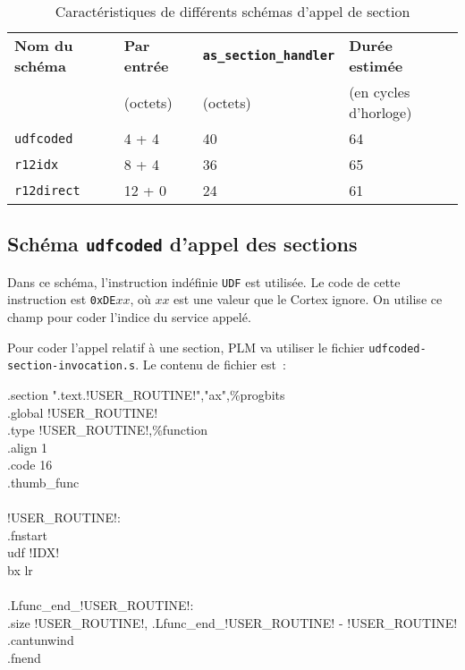 \begin{table}[t]
\centering
\begin{tabular}{llll}
  \textbf{Nom du schéma} & \textbf{Par entrée} & \textbf{\texttt{as\_section\_handler}} & \textbf{Durée estimée} \\
   & (octets) & (octets) & (en cycles d'horloge) \\
  \texttt{udfcoded} & 4 + 4 & 40 & 64 \\
  \texttt{r12idx} & 8 + 4 & 36 & 65 \\
  \texttt{r12direct} & 12 + 0 & 24 & 61 \\
\end{tabular}
\caption{Caractéristiques de différents schémas d'appel de section}
\ligne
\end{table}


\subsection{Schéma \texttt{udfcoded} d'appel des sections}

Dans ce schéma, l'instruction indéfinie \texttt{UDF} est utilisée. Le code de cette instruction est \texttt{0xDE$xx$}, où $xx$ est une valeur que le Cortex ignore. On utilise ce champ pour coder l'indice du service appelé.

Pour coder l'appel relatif à une section, PLM va utiliser le fichier \texttt{udfcoded-section-invocation.s}. Le contenu de fichier est~:
\begin{SHELL}\small
\hspace*{1.2em}.section  ".text.!USER\_ROUTINE!","ax",\%progbits\\
\hspace*{1.2em}.global !USER\_ROUTINE!\\
\hspace*{1.2em}.type  !USER\_ROUTINE!,\%function\\
\hspace*{1.2em}.align  1\\
\hspace*{1.2em}.code  16\\
\hspace*{1.2em}.thumb\_func\\
\\
!USER\_ROUTINE!:\\
\hspace*{1.2em}.fnstart\\
\hspace*{1.2em}udf !IDX!\\
\hspace*{1.2em}bx  lr\\
\\
.Lfunc\_end\_!USER\_ROUTINE!:\\
\hspace*{1.2em}.size  !USER\_ROUTINE!, .Lfunc\_end\_!USER\_ROUTINE! - !USER\_ROUTINE!\\
\hspace*{1.2em}.cantunwind\\
\hspace*{1.2em}.fnend
\end{SHELL}


